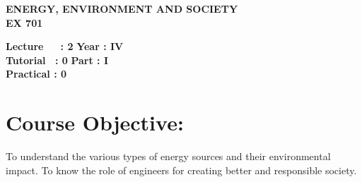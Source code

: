 \begin{center}
    \textbf{\huge{\uppercase{Energy, Environment and Society}}}
    \\
    \vspace{.5cm}
    \textbf{\large{EX 701}}
\end{center}

\noindent\textbf{Lecture\ \ \ : 2} \hfill \textbf{Year : IV} \\
\textbf{Tutorial \ : 0} \hfill \textbf{Part : I } \\
\textbf{Practical : 0}  \\

\par
\noindent 
\section*{Course Objective:}
To understand the various types of energy sources and their environmental impact. To know the role of engineers for creating better and responsible society.


